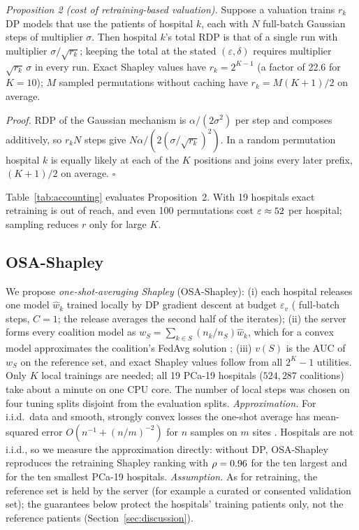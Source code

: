 \documentclass[journal]{IEEEtran}
\begin{document}
\emph{Proposition 2 (cost of retraining-based valuation).} Suppose a valuation trains $r_k$ DP models that use the patients of hospital $k$, each with $N$ full-batch Gaussian steps of multiplier $\sigma$. Then hospital $k$'s total RDP is that of a single run with multiplier $\sigma/\sqrt{r_k}$; keeping the total at the stated $(\varepsilon,\delta)$ requires multiplier $\sqrt{r_k}\,\sigma$ in every run. Exact Shapley values have $r_k=2^{K-1}$ (a factor of 22.6 for $K=10$); $M$ sampled permutations without caching have $r_k=M(K+1)/2$ on average.

\emph{Proof.} RDP of the Gaussian mechanism is $\alpha/(2\sigma^2)$ per step and composes additively, so $r_kN$ steps give $N\alpha/(2(\sigma/\sqrt{r_k})^2)$. In a random permutation hospital $k$ is equally likely at each of the $K$ positions and joins every later prefix, $(K+1)/2$ on average. $\square$



Table~\ref{tab:accounting} evaluates Proposition~2. With 19 hospitals exact retraining is out of reach, and even 100 permutations cost $\varepsilon\approx52$ per hospital; sampling reduces $r$ only for large $K$.

\subsection{OSA-Shapley}
\label{sec:osa}
We propose \emph{one-shot-averaging Shapley} (OSA-Shapley): (i) each hospital releases one model $\hat w_k$ trained locally by DP gradient descent at budget $\varepsilon_v$ (\osaSteps{} full-batch steps, $C=1$; the release averages the second half of the iterates); (ii) the server forms every coalition model as $w_S=\sum_{k\in S}(n_k/n_S)\hat w_k$, which for a convex model approximates the coalition's FedAvg solution \cite{Zhang2013AVGM}; (iii) $v(S)$ is the AUC of $w_S$ on the reference set, and exact Shapley values follow from all $2^K-1$ utilities. Only $K$ local trainings are needed; all 19 PCa-19 hospitals ($524{,}287$ coalitions) take about a minute on one CPU core. The number of local steps was chosen on four tuning splits disjoint from the evaluation splits. \emph{Approximation.} For i.i.d.\ data and smooth, strongly convex losses the one-shot average has mean-squared error $O(n^{-1} + (n/m)^{-2})$ for $n$ samples on $m$ sites \cite{Zhang2013AVGM}. Hospitals are not i.i.d., so we measure the approximation directly: without DP, OSA-Shapley reproduces the retraining Shapley ranking with $\rho=0.96$ for the ten largest and \pxSOsaNoDP{} for the ten smallest PCa-19 hospitals. \emph{Assumption.} As for retraining, the reference set is held by the server (for example a curated or consented validation set); the guarantees below protect the hospitals' training patients only, not the reference patients (Section~\ref{sec:discussion}).
\end{document}

